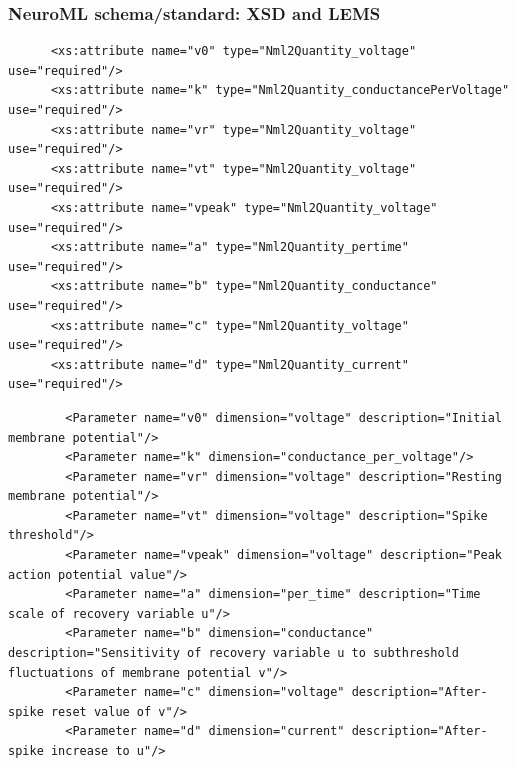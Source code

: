 \begin{frame}[fragile,c]
  \frametitle{NeuroML schema/standard: XSD and LEMS}
  \begin{center}
    \begin{verbatim}
      <xs:attribute name="v0" type="Nml2Quantity_voltage" use="required"/>
      <xs:attribute name="k" type="Nml2Quantity_conductancePerVoltage" use="required"/>
      <xs:attribute name="vr" type="Nml2Quantity_voltage" use="required"/>
      <xs:attribute name="vt" type="Nml2Quantity_voltage" use="required"/>
      <xs:attribute name="vpeak" type="Nml2Quantity_voltage" use="required"/>
      <xs:attribute name="a" type="Nml2Quantity_pertime" use="required"/>
      <xs:attribute name="b" type="Nml2Quantity_conductance" use="required"/>
      <xs:attribute name="c" type="Nml2Quantity_voltage" use="required"/>
      <xs:attribute name="d" type="Nml2Quantity_current" use="required"/>
    \end{verbatim}
    \begin{verbatim}
        <Parameter name="v0" dimension="voltage" description="Initial membrane potential"/>
        <Parameter name="k" dimension="conductance_per_voltage"/>
        <Parameter name="vr" dimension="voltage" description="Resting membrane potential"/>
        <Parameter name="vt" dimension="voltage" description="Spike threshold"/>
        <Parameter name="vpeak" dimension="voltage" description="Peak action potential value"/>
        <Parameter name="a" dimension="per_time" description="Time scale of recovery variable u"/>
        <Parameter name="b" dimension="conductance" description="Sensitivity of recovery variable u to subthreshold fluctuations of membrane potential v"/>
        <Parameter name="c" dimension="voltage" description="After-spike reset value of v"/>
        <Parameter name="d" dimension="current" description="After-spike increase to u"/>
    \end{verbatim}
  \end{center}
\end{frame}
